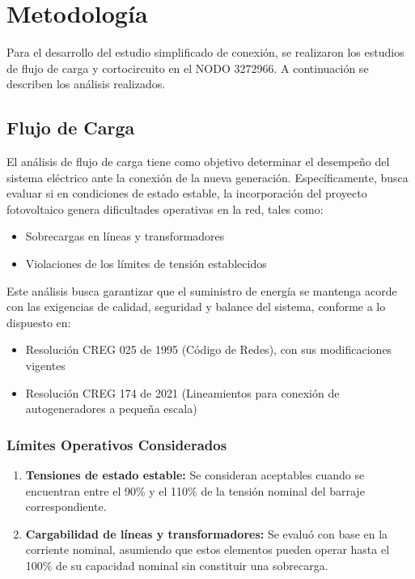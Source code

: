 \chapter{Metodología}

Para el desarrollo del estudio simplificado de conexión, se realizaron los estudios de flujo de carga y cortocircuito en el NODO 3272966. A continuación se describen los análisis realizados.

\section{Flujo de Carga}

El análisis de flujo de carga tiene como objetivo determinar el desempeño del sistema eléctrico ante la conexión de la nueva generación. Específicamente, busca evaluar si en condiciones de estado estable, la incorporación del proyecto fotovoltaico genera dificultades operativas en la red, tales como:

\begin{itemize}
    \item Sobrecargas en líneas y transformadores
    \item Violaciones de los límites de tensión establecidos
\end{itemize}

Este análisis busca garantizar que el suministro de energía se mantenga acorde con las exigencias de calidad, seguridad y balance del sistema, conforme a lo dispuesto en:

\begin{itemize}
    \item Resolución CREG 025 de 1995 (Código de Redes), con sus modificaciones vigentes
    \item Resolución CREG 174 de 2021 (Lineamientos para conexión de autogeneradores a pequeña escala)
\end{itemize}

\subsection{Límites Operativos Considerados}

\begin{enumerate}
    \item \textbf{Tensiones de estado estable:} Se consideran aceptables cuando se encuentran entre el 90\% y el 110\% de la tensión nominal del barraje correspondiente.
    
    \item \textbf{Cargabilidad de líneas y transformadores:} Se evaluó con base en la corriente nominal, asumiendo que estos elementos pueden operar hasta el 100\% de su capacidad nominal sin constituir una sobrecarga.
\end{enumerate}

